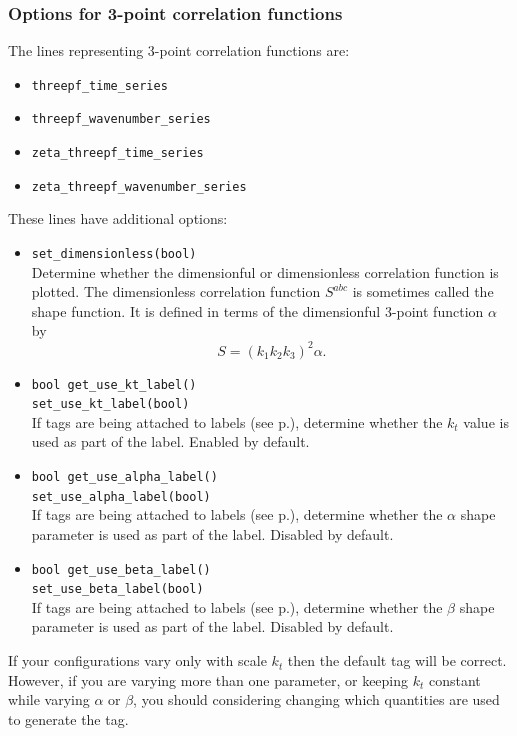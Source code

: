 \documentclass[11pt,a4paper]{article}
\newcommand{\DimlessB}{S}
\begin{document}
\subsubsection{Options for 3-point correlation functions}
The lines representing 3-point correlation functions are:
\begin{itemize}
    \item \texttt{threepf_time_series}
    \item \texttt{threepf_wavenumber_series}
    \item \texttt{zeta_threepf_time_series}
    \item \texttt{zeta_threepf_wavenumber_series}
\end{itemize}
These lines have additional options:
\begin{itemize}
    \item \texttt{set_dimensionless(bool)} \\
    Determine whether the dimensionful or dimensionless correlation
    function is plotted.
    The dimensionless correlation function $\DimlessB^{abc}$
    is sometimes called the shape function.
    It is defined
    in terms of the dimensionful 3-point function $\alpha$
    by
    \begin{equation}
        \DimlessB = (k_1 k_2 k_3)^2 \alpha .
    \end{equation}
    
    \item \texttt{bool get_use_kt_label()} \\
    \texttt{set_use_kt_label(bool)} \\
    If tags are
    being attached to labels
    (see p.\pageref{method:get_label_tags}),
    determine whether the $k_t$ value is used as part of the label.
    Enabled by default.
    
    \item \texttt{bool get_use_alpha_label()} \\
    \texttt{set_use_alpha_label(bool)} \\
    If tags are
    being attached to labels
    (see p.\pageref{method:get_label_tags}),
    determine whether the $\alpha$ shape parameter is used as part of the label.
    Disabled by default.
    
    \item \texttt{bool get_use_beta_label()} \\
    \texttt{set_use_beta_label(bool)} \\
    If tags are
    being attached to labels
    (see p.\pageref{method:get_label_tags}),
    determine whether the $\beta$ shape parameter is used as part of the label.
    Disabled by default.
\end{itemize}
If your configurations vary only with scale $k_t$ then the default tag
will be correct.
However, if you are varying more than one parameter, or keeping $k_t$
constant while varying $\alpha$ or $\beta$,
you should considering changing which quantities are
used to generate the tag.
\end{document}
